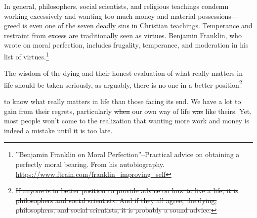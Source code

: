 \documentclass[10pt, letterpaper]{article}
\providecommand{\DIFaddtex}[1]{{\protect\color{blue}\uwave{#1}}} %
\providecommand{\DIFdeltex}[1]{{\protect\color{red}\sout{#1}}}                      %
\providecommand{\DIFaddbegin}{} %
\providecommand{\DIFaddend}{} %
\providecommand{\DIFdelbegin}{} %
\providecommand{\DIFdelend}{} %
\providecommand{\DIFadd}[1]{\texorpdfstring{\DIFaddtex{#1}}{#1}} %
\providecommand{\DIFdel}[1]{\texorpdfstring{\DIFdeltex{#1}}{}} %
\newcommand{\DIFscaledelfig}{0.5}
\newlength{\DIFdelgraphicswidth} %
\newlength{\DIFdelgraphicsheight} %
\newcommand{\DIFaddincludegraphics}[2][]{{\color{blue}\fbox{\DIFOincludegraphics[#1]{#2}}}} %
\newcommand{\DIFdelincludegraphics}[2][]{%
\sbox{\DIFdelgraphicsbox}{\DIFOincludegraphics[#1]{#2}}%
\settoboxwidth{\DIFdelgraphicswidth}{\DIFdelgraphicsbox} %
\settoboxtotalheight{\DIFdelgraphicsheight}{\DIFdelgraphicsbox} %
\scalebox{\DIFscaledelfig}{%
\parbox[b]{\DIFdelgraphicswidth}{\usebox{\DIFdelgraphicsbox}\\[-\baselineskip] \rule{\DIFdelgraphicswidth}{0em}}\llap{\resizebox{\DIFdelgraphicswidth}{\DIFdelgraphicsheight}{%
\setlength{\unitlength}{\DIFdelgraphicswidth}%
\begin{picture}(1,1)%
\thicklines\linethickness{2pt} %
{\color[rgb]{1,0,0}\put(0,0){\framebox(1,1){}}}%
{\color[rgb]{1,0,0}\put(0,0){\line( 1,1){1}}}%
{\color[rgb]{1,0,0}\put(0,1){\line(1,-1){1}}}%
\end{picture}%
}\hspace*{3pt}}} %
} %
\DeclareRobustCommand{\DIFaddbegin}{\DIFOaddbegin \let\includegraphics\DIFaddincludegraphics} %
\DeclareRobustCommand{\DIFaddend}{\DIFOaddend \let\includegraphics\DIFOincludegraphics} %
\DeclareRobustCommand{\DIFdelbegin}{\DIFOdelbegin \let\includegraphics\DIFdelincludegraphics} %
\DeclareRobustCommand{\DIFdelend}{\DIFOaddend \let\includegraphics\DIFOincludegraphics} %
\begin{document}
\begin{spacing}{1.8}
In general, philosophers, social scientists, 
 and religious teachings condemn working excessively and wanting too much money and material possessions---greed is even one of the seven deadly sins in Christian teachings. 
Temperance and restraint from excess are traditionally seen as virtues. Benjamin Franklin, who wrote on moral perfection, includes frugality, temperance, and moderation in his list of virtues.\footnote{''Benjamin Franklin on Moral Perfection''--Practical advice on obtaining a perfectly moral bearing. From his autobiography. \url{https://www.ftrain.com/franklin_improving_self}}

The wisdom of the dying and their honest %
evaluation of what really matters in life should be taken seriously, as arguably, there is no one in a better position\DIFdelbegin \footnote{\DIFdel{If anyone is in better position to provide advice on how to live a life, it is philosophers and social scientists. And if they all agree, the dying, philosophers, and social scientists, it is probably a sound advice.}} %
\addtocounter{footnote}{-1}%
\DIFdelend %
 to know what really matters in life than those facing its end. We have a lot to gain from their regrets, particularly \DIFdelbegin \DIFdel{when }\DIFdelend \DIFaddbegin \DIFadd{if }\DIFaddend our own way of life \DIFdelbegin \DIFdel{was }\DIFdelend \DIFaddbegin \DIFadd{is }\DIFaddend like theirs. Yet, most people won't come to the realization that wanting more work and money is indeed a mistake until it is too late.


\end{spacing}
\end{document}

